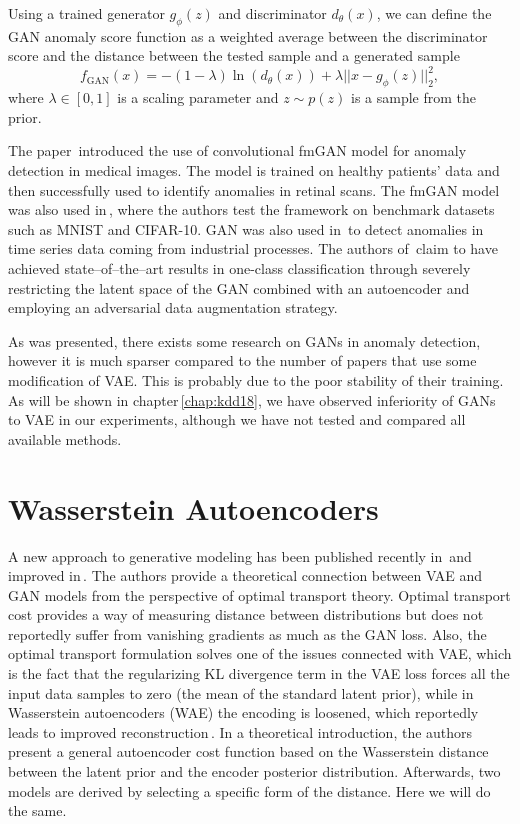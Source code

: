 Using a trained generator $g_{\phi}(z)$ and discriminator $d_{\theta}(x)$,
we can define the GAN anomaly score function as a weighted average
between the discriminator score and the distance between the tested
sample and a generated sample
\begin{equation}
f_{\text{GAN}}(x)=-(1-\lambda)\ln(d_{\theta}(x))+\lambda||x-g_{\phi}(z)||_{2}^{2},\label{eq:gan_score}
\end{equation}
where $\lambda\in\left[0,1\right]$ is a scaling parameter and $z\sim p(z)$
is a sample from the prior.

The paper\,\cite{schlegl2017unsupervised} introduced the use of
convolutional fmGAN model for anomaly detection in medical images.
The model is trained on healthy patients' data and then successfully
used to identify anomalies in retinal scans. The fmGAN model was also
used in\,\cite{kliger2018novelty}, where the authors test the framework
on benchmark datasets such as MNIST and CIFAR-10. GAN was also used
in\,\cite{wang2018generative} to detect anomalies in time series
data coming from industrial processes. The authors of\,\cite{perera2019ocgan}
claim to have achieved state--of--the--art results in one-class
classification through severely restricting the latent space of the
GAN combined with an autoencoder and employing an adversarial data
augmentation strategy.

As was presented, there exists some research on GANs in anomaly detection,
however it is much sparser compared to the number of papers that use
some modification of VAE. This is probably due to the poor stability
of their training. As will be shown in chapter\,\ref{chap:kdd18},
we have observed inferiority of GANs to VAE in our experiments, although
we have not tested and compared all available methods.

\section{Wasserstein Autoencoders}

A new approach to generative modeling has been published recently
in\,\cite{mescheder2017adversarial} and improved in\,\cite{tolstikhin2017wasserstein}.
The authors provide a theoretical connection between VAE and GAN models
from the perspective of optimal transport theory. Optimal transport
cost provides a way of measuring distance between distributions but
does not reportedly suffer from vanishing gradients as much as the
GAN loss. Also, the optimal transport formulation solves one of the
issues connected with VAE, which is the fact that the regularizing
KL divergence term in the VAE loss forces all the input data samples
to zero (the mean of the standard latent prior), while in Wasserstein
autoencoders (WAE) the encoding is loosened, which reportedly leads
to improved reconstruction\,\cite{tolstikhin2017wasserstein}. In
a theoretical introduction, the authors present a general autoencoder
cost function based on the Wasserstein distance between the latent
prior and the encoder posterior distribution. Afterwards, two models
are derived by selecting a specific form of the distance. Here we
will do the same.

